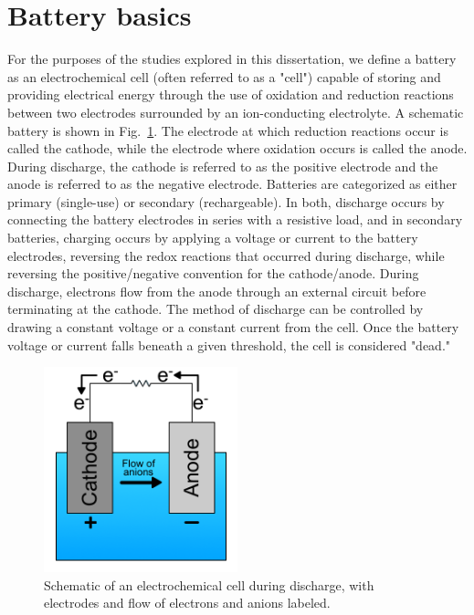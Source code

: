 \section{Battery basics}
\label{sec:pastwork:basics}

For the purposes of the studies explored in this dissertation, we define a battery as an electrochemical cell (often referred to as a "cell") capable of storing and providing electrical energy through the use of oxidation and reduction reactions between two electrodes surrounded by an ion-conducting electrolyte. A schematic battery is shown in Fig.~\ref{fig:echemschem}. The electrode at which reduction reactions occur is called the cathode, while the electrode where oxidation occurs is called the anode. During discharge, the cathode is referred to as the positive electrode and the anode is referred to as the negative electrode. Batteries are categorized as either primary (single-use) or secondary (rechargeable). In both, discharge occurs by connecting the battery electrodes in series with a resistive load, and in secondary batteries, charging occurs by applying a voltage or current to the battery electrodes, reversing the redox reactions that occurred during discharge, while reversing the positive/negative convention for the cathode/anode. During discharge, electrons flow from the anode through an external circuit before terminating at the cathode. The method of discharge can be controlled by drawing a constant voltage or a constant current from the cell. Once the battery voltage or current falls beneath a given threshold, the cell is considered "dead."

\begin{figure}[htb]
  \centering
    \includegraphics[width=0.5\textwidth]{ch2-pastwork/images/echemschem.png}
    \caption[Schematic of an electrochemical cell during discharge.]{Schematic of an electrochemical cell during discharge, with electrodes and flow of electrons and anions labeled.}
    \label{fig:echemschem}
\end{figure}


